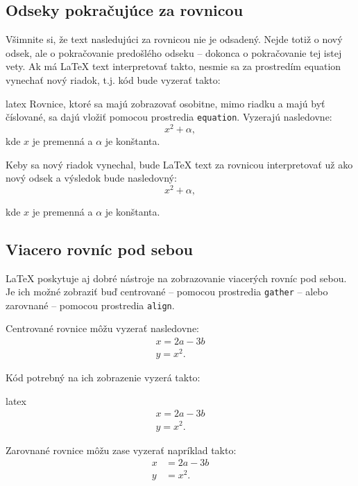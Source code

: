 \subsection{Odseky pokračujúce za rovnicou}

Všimnite si, že text nasledujúci za rovnicou nie je odsadený. Nejde totiž o nový odsek, ale o pokračovanie predošlého odseku -- dokonca o pokračovanie tej istej vety. Ak má LaTeX text interpretovať takto, nesmie sa za prostredím equation vynechať nový riadok, t.j. kód bude vyzerať takto:
\begin{inlinecode}{latex}
Rovnice, ktoré sa majú zobrazovať osobitne, mimo riadku a majú byť číslované, sa dajú vložiť pomocou prostredia \texttt{equation}. Vyzerajú nasledovne:
\begin{equation}
x^2 + \alpha,
\end{equation}
kde $x$ je premenná a $\alpha$ je konštanta.
\end{inlinecode}

Keby sa nový riadok vynechal, bude LaTeX text za rovnicou interpretovať už ako nový odsek a výsledok bude nasledovný:
\begin{equation}
x^2 + \alpha,
\end{equation}
	
kde $x$ je premenná a $\alpha$ je konštanta.

\subsection{Viacero rovníc pod sebou}

LaTeX poskytuje aj dobré nástroje na zobrazovanie viacerých rovníc pod sebou. Je ich možné zobraziť buď centrované -- pomocou prostredia \texttt{gather} -- alebo zarovnané -- pomocou prostredia \texttt{align}.

Centrované rovnice môžu vyzerať nasledovne:
\begin{gather}
x = 2a - 3b \\
y = x^2.
\end{gather}

Kód potrebný na ich zobrazenie vyzerá takto:
\begin{inlinecode}{latex}
\begin{gather}
x = 2a - 3b \\
y = x^2.
\end{gather}
\end{inlinecode}

Zarovnané rovnice môžu zase vyzerať napríklad takto:
\begin{align}
x &= 2a - 3b \\
y &= x^2.
\end{align}


